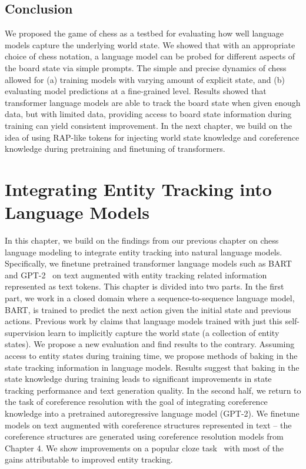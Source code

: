 \documentclass[12pt]{thesis-umich}[thesis]
\begin{document}
  \section{Conclusion}
We proposed the game of chess as a testbed for evaluating how well language models capture the underlying world state. 
We showed that with an appropriate choice of chess notation, a language model can be probed for different aspects of the board state via simple prompts.
The simple and precise dynamics of chess allowed for (a) training models with varying amount of explicit state, and (b) evaluating 
model predictions at a fine-grained level.
Results showed that transformer language models are able to track the board state when given enough
data, but with limited data, providing access to board state information during training can yield consistent improvement. 
In the next chapter, we build on the idea of using RAP-like tokens for  injecting world state knowledge and coreference knowledge during pretraining and finetuning of transformers.  



 




 \chapter{Integrating Entity Tracking into Language Models}

In this chapter, we build on the findings from our previous chapter on chess language modeling to integrate entity tracking into natural language models. 
Specifically, we finetune pretrained transformer language models such as BART~\cite{lewis-etal-2020-bart} and GPT-2~\cite{radford2019language} on text augmented with entity tracking related information represented as text tokens. 
This chapter is divided into two parts. 
In the first part, we work in a closed domain where a sequence-to-sequence language model, BART, is trained to predict the next action given the initial state and previous actions. 
Previous work by \citet{li-etal-2021-implicit} claims that language models trained with just this self-supervision learn to implicitly capture the world state (a collection of entity states). We propose a new evaluation and find results to the contrary. 
Assuming access to entity states during training time, we propose methods of baking in the state tracking information in language models. 
Results suggest that baking in the state knowledge during training leads to significant improvements in state tracking performance and text generation quality. 
In the second half, we return to the task of coreference resolution with the goal of integrating coreference knowledge into a pretrained autoregressive language model (GPT-2). We finetune models on text augmented with coreference structures represented in text -- the coreference structures are generated using coreference resolution models from Chapter 4. We show  improvements on a popular cloze task~\cite{paperno-etal-2016-lambada} with most of the gains attributable to improved entity tracking.
\end{document}
